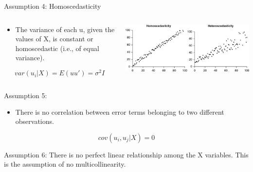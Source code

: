 \documentclass[australian,ignorenonframetext,aspectratio=169]{beamer}
\providecommand{\tightlist}{%
  \setlength{\itemsep}{0pt}\setlength{\parskip}{0pt}}
\begin{document}
\begin{frame}{Assumption 4: Homoscedasticity}
\protect\hypertarget{assumption-4-homoscedasticity}{}

\begin{columns}[T]
\begin{column}{0.5\textwidth}
\begin{itemize}
\tightlist
\item
  The variance of each u, given the values of X, is constant or
  homoscedastic (i.e., of equal variance).
\end{itemize}

\[var(u_i | X) = E(uu')
= \sigma^2I\]
\end{column}

\begin{column}{0.5\textwidth}
\begin{center}\includegraphics[width=1\linewidth]{../graphs/homosc} \end{center}
\end{column}
\end{columns}

\end{frame}

\begin{frame}{Assumption 5:}
\protect\hypertarget{assumption-5}{}

\begin{itemize}
\tightlist
\item
  There is no correlation between error terms belonging to two different
  observations.
\end{itemize}

\[cov(u_i, u_j | X) = 0\]

Assumption 6: There is no perfect linear relationship among the X
variables. This is the assumption of no multicollinearity.

\end{frame}

\end{document}
